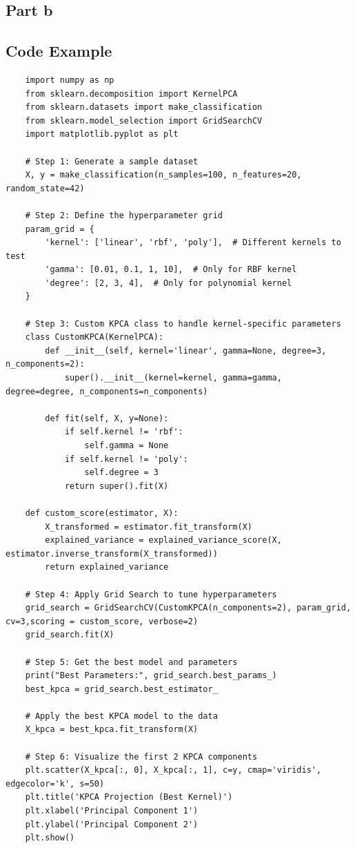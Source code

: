 \subsection{Part b}
\begin{theorem}[test]
    \lipsum[2]
\end{theorem}
%
\lipsum[34]
%
\begin{eg}[test]
    \lipsum[36]
\end{eg}
%
\subsection{Code Example}
\begin{verbatim}
    import numpy as np
    from sklearn.decomposition import KernelPCA
    from sklearn.datasets import make_classification
    from sklearn.model_selection import GridSearchCV
    import matplotlib.pyplot as plt

    # Step 1: Generate a sample dataset
    X, y = make_classification(n_samples=100, n_features=20, random_state=42)

    # Step 2: Define the hyperparameter grid
    param_grid = {
        'kernel': ['linear', 'rbf', 'poly'],  # Different kernels to test
        'gamma': [0.01, 0.1, 1, 10],  # Only for RBF kernel
        'degree': [2, 3, 4],  # Only for polynomial kernel
    }

    # Step 3: Custom KPCA class to handle kernel-specific parameters
    class CustomKPCA(KernelPCA):
        def __init__(self, kernel='linear', gamma=None, degree=3, n_components=2):
            super().__init__(kernel=kernel, gamma=gamma, degree=degree, n_components=n_components)

        def fit(self, X, y=None):
            if self.kernel != 'rbf':
                self.gamma = None
            if self.kernel != 'poly':
                self.degree = 3
            return super().fit(X)
        
    def custom_score(estimator, X):
        X_transformed = estimator.fit_transform(X)
        explained_variance = explained_variance_score(X, estimator.inverse_transform(X_transformed))
        return explained_variance

    # Step 4: Apply Grid Search to tune hyperparameters
    grid_search = GridSearchCV(CustomKPCA(n_components=2), param_grid, cv=3,scoring = custom_score, verbose=2)
    grid_search.fit(X)

    # Step 5: Get the best model and parameters
    print("Best Parameters:", grid_search.best_params_)
    best_kpca = grid_search.best_estimator_

    # Apply the best KPCA model to the data
    X_kpca = best_kpca.fit_transform(X)

    # Step 6: Visualize the first 2 KPCA components
    plt.scatter(X_kpca[:, 0], X_kpca[:, 1], c=y, cmap='viridis', edgecolor='k', s=50)
    plt.title('KPCA Projection (Best Kernel)')
    plt.xlabel('Principal Component 1')
    plt.ylabel('Principal Component 2')
    plt.show()
\end{verbatim}
